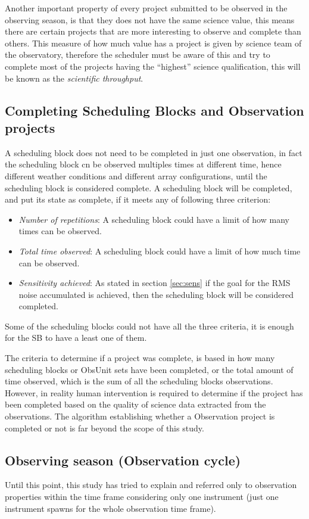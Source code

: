 Another important property of every project submitted to be observed in the observing season, is that they does not have the same science value, this means there are certain projects that are more interesting to observe and complete than others. This measure of how much value has a project is given by science team of the observatory, therefore the scheduler must be aware of this and try to complete most of the projects having the ``highest'' science qualification, this will be known as the \textit{scientific throughput}.

\subsection{Completing Scheduling Blocks and Observation projects}
A scheduling block does not need to be completed in just one observation, in fact the scheduling block cn be observed multiples times at different time, hence different weather conditions and different array configurations, until the scheduling block is considered complete.
A scheduling block will be completed, and put its state as complete, if it meets any of following three criterion:
\begin{itemize}
	\item \textit{Number of repetitions}: A scheduling block could have a limit of how many times can be observed.
	\item \textit{Total time observed}: A scheduling block could have a limit of how much time can be observed.
	\item \textit{Sensitivity achieved}: As stated in section \ref{sec:sens} if the goal for the RMS noise accumulated is achieved, then the scheduling block will be considered completed.
\end{itemize} 
Some of the scheduling blocks could not have all the three criteria, it is enough for the SB to have a least one of them.

The criteria to determine if a project was complete, is based in how many scheduling blocks or ObsUnit sets have been completed, or the total amount of time observed, which is the sum of all the scheduling blocks observations. However, in reality human intervention is required to determine if the project has been completed based on the quality of science data extracted from the observations. The algorithm establishing whether a Observation project is completed or not is far beyond the scope of this study. 

\subsection{Observing season (Observation cycle)}
Until this point, this study has tried to explain and referred only to observation properties within the time frame considering only one instrument (just one instrument spawns for the whole observation time frame). 

